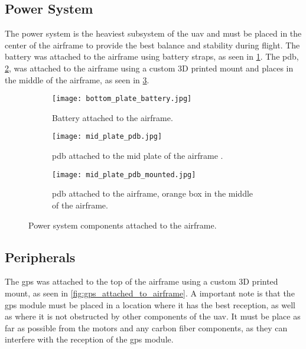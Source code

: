 \subsection{Power System}\label{subsec:implementation_power_system}

The power system is the heaviest subsystem of the \gls{uav} and must be placed in the center of the airframe to provide the best balance and stability during flight. The battery was attached to the airframe using battery straps, as seen in \cref{fig:battery_attached_to_airframe}. The \gls{pdb}, \cref{fig:pdb}, was attached to the airframe using a custom 3D printed mount and places in the middle of the airframe, as seen in \cref{fig:power_distribution_board_attached_to_airframe}.

\begin{figure}
  \begin{subfigure}[t]{0.3\linewidth}
    \texttt{[image: bottom\_plate\_battery.jpg]}
    \caption{Battery attached to the airframe.}\label{fig:battery_attached_to_airframe}
  \end{subfigure}
  \hfill
  \begin{subfigure}[t]{0.3\linewidth}
    \texttt{[image: mid\_plate\_pdb.jpg]}
    \caption{\gls{pdb} attached to the mid plate of the airframe \autocite{developingcosteffectivedrones5g}.}\label{fig:pdb}
  \end{subfigure}
  \hfill
  \begin{subfigure}[t]{0.3\linewidth}
    \texttt{[image: mid\_plate\_pdb\_mounted.jpg]}
    \caption{\gls{pdb} attached to the airframe, orange box in the middle of the airframe.}\label{fig:power_distribution_board_attached_to_airframe}
  \end{subfigure}

  \caption{Power system components attached to the airframe.}\label{fig:power_system_components_attached_to_airframe}
\end{figure}

\subsection{Peripherals}\label{subsec:implementation_peripherals}

The \gls{gps} was attached to the top of the airframe using a custom 3D printed mount, as seen in \cref{fig:gps_attached_to_airframe}. A important note is that the \gls{gps} module must be placed in a location where it has the best reception, as well as where it is not obstructed by other components of the \gls{uav}. It must be place as far as possible from the motors and any carbon fiber components, as they can interfere with the reception of the \gls{gps} module.


